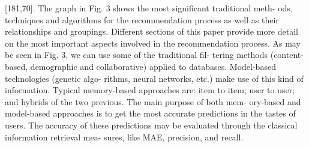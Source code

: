 \documentclass[11pt]{article}
\begin{document}
[181,70].
The graph in Fig. 3 shows the most significant traditional meth-
ods, techniques and algorithms for the recommendation process as
well as their relationships and groupings. Different sections of this
paper provide more detail on the most important aspects involved
in the recommendation process.
As may be seen in Fig. 3, we can use some of the traditional fil-
tering methods (content-based, demographic and collaborative)
applied to databases. Model-based technologies (genetic algo-
rithms, neural networks, etc.) make use of this kind of information.
Typical memory-based approaches are: item to item; user to user;
and hybrids of the two previous. The main purpose of both mem-
ory-based and model-based approaches is to get the most accurate
predictions in the tastes of users. The accuracy of these predictions
may be evaluated through the classical information retrieval mea-
sures, like MAE, precision, and recall.
\end{document}
